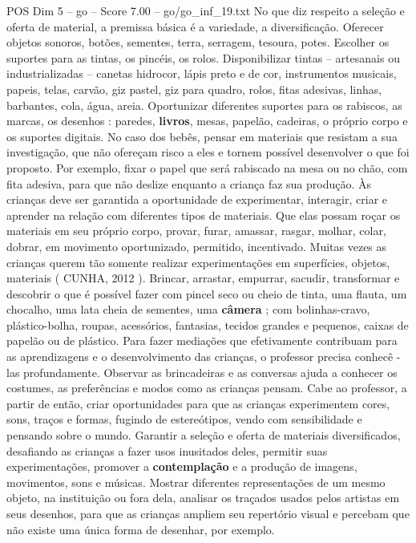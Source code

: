 \begin{textsample}{POS Dim 5 – go – Score 7.00 – go/go\_inf\_19.txt}
No que diz respeito a seleção e oferta de material, a premissa básica é a variedade, a diversificação.
Oferecer objetos sonoros, botões, sementes, terra, serragem, tesoura, potes.
Escolher os suportes para as tintas, os pincéis, os rolos.
Disponibilizar tintas – artesanais ou industrializadas – canetas hidrocor, lápis preto e de cor, instrumentos musicais, papeis, telas, carvão, giz pastel, giz para quadro, rolos, fitas adesivas, linhas, barbantes, cola, água, areia.
Oportunizar diferentes suportes para os rabiscos, as marcas, os desenhos : paredes, \textbf{livros}, mesas, papelão, cadeiras, o próprio corpo e os suportes digitais.
No caso dos bebês, pensar em materiais que resistam a sua investigação, que não ofereçam risco a eles e tornem possível desenvolver o que foi proposto.
Por exemplo, fixar o papel que será rabiscado na mesa ou no chão, com fita adesiva, para que não deslize enquanto a criança faz sua produção.
Às crianças deve ser garantida a oportunidade de experimentar, interagir, criar e aprender na relação com diferentes tipos de materiais.
Que elas possam roçar os materiais em seu próprio corpo, provar, furar, amassar, rasgar, molhar, colar, dobrar, em movimento oportunizado, permitido, incentivado.
Muitas vezes as crianças querem tão somente realizar experimentações em superfícies, objetos, materiais ( CUNHA, 2012 ).
Brincar, arrastar, empurrar, sacudir, transformar e descobrir o que é possível fazer com pincel seco ou cheio de tinta, uma flauta, um chocalho, uma lata cheia de sementes, uma \textbf{câmera} ; com bolinhas-cravo, plástico-bolha, roupas, acessórios, fantasias, tecidos grandes e pequenos, caixas de papelão ou de plástico.
Para fazer mediações que efetivamente contribuam para as aprendizagens e o desenvolvimento das crianças, o professor precisa conhecê -las profundamente.
Observar as brincadeiras e as conversas ajuda a conhecer os costumes, as preferências e modos como as crianças pensam.
Cabe ao professor, a partir de então, criar oportunidades para que as crianças experimentem cores, sons, traços e formas, fugindo de estereótipos, vendo com sensibilidade e pensando sobre o mundo.
Garantir a seleção e oferta de materiais diversificados, desafiando as crianças a fazer usos inusitados deles, permitir suas experimentações, promover a \textbf{contemplação} e a produção de imagens, movimentos, sons e músicas.
Mostrar diferentes representações de um mesmo objeto, na instituição ou fora dela, analisar os traçados usados pelos artistas em seus desenhos, para que as crianças ampliem seu repertório visual e percebam que não existe uma única forma de desenhar, por exemplo.

\end{textsample}
